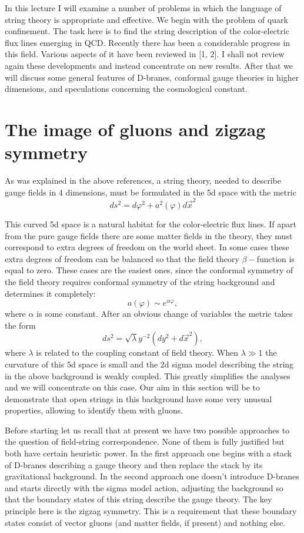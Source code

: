 \documentclass[a4paper,12pt]{article}
\begin{document}
In this lecture I will examine a number of problems in which the language of
string theory is appropriate and effective. We begin with the problem of
quark confinement. The task here is to find the string description of the
color-electric flux lines emerging in QCD. Recently there has been a
considerable progress in this field. Various aspects of it have been
reviewed in [1, 2]. I shall not review again these developments and instead
concentrate on new results. After that we will discuss some general features
of D-branes, conformal gauge theories in higher dimensions, and speculations
concerning the cosmological constant.

\section{The image of gluons and zigzag symmetry}

As was explained in the above references, a string theory, needed to
describe gauge fields in 4 dimensions, must be formulated in the 5d space
with the metric 
\begin{equation}
ds^{2}=d\varphi ^{2}+a^{2}(\varphi )d\vec{x}^{2}
\end{equation}

This curved 5d space is a natural habitat for the color-electric flux
lines. If apart from the pure gauge fields there are some matter fields in
the theory, they must correspond to extra degrees of freedom on the world
sheet. In some cases these extra degrees of freedom can be balanced so that
the field theory $\beta -$function is equal to zero. These cases are the
easiest ones, since the conformal symmetry of the field theory requires
conformal symmetry of the string background and determines it completely:
$$
a(\varphi )\sim e^{\alpha \varphi },
$$
where $\alpha $ is some constant. After an obvious change of variables the
metric takes the form 
\begin{equation}
ds^{2}=\sqrt{\lambda }y^{-2}(dy^{2}+d\vec{x}^{2}),
\end{equation}
where $\lambda $ is related to the coupling constant of field theory. When $%
\lambda \gg 1$ the curvature of this 5d space is small and the 2d sigma
model describing the string in the above background is weakly coupled. This
greatly simplifies the analyses and we will concentrate on this case. Our
aim in this section will be to demonstrate that open strings in this
background have some very unusual properties, allowing to identify them with
gluons.

Before starting let us recall that at present we have two possible
approaches to the question of field-string correspondence. None of them is
fully justified but both have certain heuristic power. In the first approach
one begins with a stack of D-branes describing a gauge theory and then
replace the stack by its gravitational background. In the second approach
one doesn't introduce D-branes and starts directly with the sigma model
action, adjusting the background so that the boundary states of this string
describe the gauge theory. The key principle here is the zigzag symmetry.
This is a requirement that these boundary states consist of vector gluons
(and matter fields, if present) and nothing else.
\end{document}
